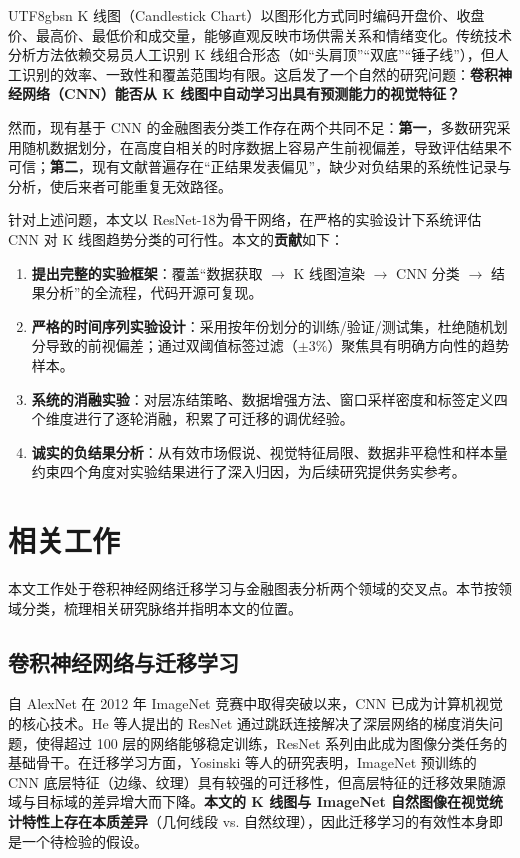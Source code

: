 \documentclass[12pt,a4paper]{article}
\begin{document}
\begin{CJK}{UTF8}{gbsn}
K 线图（Candlestick Chart）以图形化方式同时编码开盘价、收盘价、最高价、最低价和成交量，能够直观反映市场供需关系和情绪变化。传统技术分析方法\cite{murphy1999technical}依赖交易员人工识别 K 线组合形态（如``头肩顶''``双底''``锤子线''），但人工识别的效率、一致性和覆盖范围均有限。这启发了一个自然的研究问题：\textbf{卷积神经网络（CNN）能否从 K 线图中自动学习出具有预测能力的视觉特征？}

然而，现有基于 CNN 的金融图表分类工作\cite{sim2019deep,jiang2023re,cohen2022candlestick}存在两个共同不足：\textbf{第一}，多数研究采用随机数据划分，在高度自相关的时序数据上容易产生前视偏差，导致评估结果不可信；\textbf{第二}，现有文献普遍存在``正结果发表偏见''，缺少对负结果的系统性记录与分析，使后来者可能重复无效路径。

针对上述问题，本文以 ResNet-18\cite{he2016deep}为骨干网络，在严格的实验设计下系统评估 CNN 对 K 线图趋势分类的可行性。本文的\textbf{贡献}如下：

\begin{enumerate}[noitemsep]
    \item \textbf{提出完整的实验框架}：覆盖``数据获取 $\to$ K 线图渲染 $\to$ CNN 分类 $\to$ 结果分析''的全流程，代码开源可复现。
    \item \textbf{严格的时间序列实验设计}：采用按年份划分的训练/验证/测试集，杜绝随机划分导致的前视偏差；通过双阈值标签过滤（$\pm3\%$）聚焦具有明确方向性的趋势样本。
    \item \textbf{系统的消融实验}：对层冻结策略、数据增强方法、窗口采样密度和标签定义四个维度进行了逐轮消融，积累了可迁移的调优经验。
    \item \textbf{诚实的负结果分析}：从有效市场假说、视觉特征局限、数据非平稳性和样本量约束四个角度对实验结果进行了深入归因，为后续研究提供务实参考。
\end{enumerate}

\section{相关工作}

本文工作处于卷积神经网络迁移学习与金融图表分析两个领域的交叉点。本节按领域分类，梳理相关研究脉络并指明本文的位置。

\subsection{卷积神经网络与迁移学习}

自 AlexNet 在 2012 年 ImageNet 竞赛中取得突破以来，CNN 已成为计算机视觉的核心技术。He 等人\cite{he2016deep}提出的 ResNet 通过跳跃连接解决了深层网络的梯度消失问题，使得超过 100 层的网络能够稳定训练，ResNet 系列由此成为图像分类任务的基础骨干。在迁移学习方面，Yosinski 等人\cite{yosinski2014transferable}的研究表明，ImageNet 预训练的 CNN 底层特征（边缘、纹理）具有较强的可迁移性，但高层特征的迁移效果随源域与目标域的差异增大而下降。\textbf{本文的 K 线图与 ImageNet 自然图像在视觉统计特性上存在本质差异}（几何线段 vs. 自然纹理），因此迁移学习的有效性本身即是一个待检验的假设。


\end{CJK}
\end{document}
